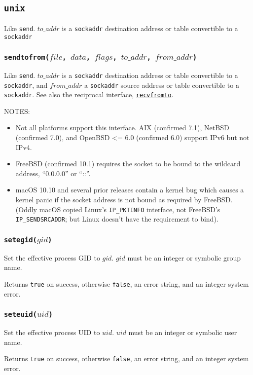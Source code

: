 \documentclass[11pt, oneside]{memoir}
\newcommand*{\true}[0]{\texttt{true}\xspace}
\newcommand*{\false}[0]{\texttt{false}\xspace}
\newcommand*{\syscall}[1]{\texttt{#1}\xspace}
\newcommand*{\fn}[1]{\texttt{#1}\xspace}
\newcommand*{\sockaddr}[0]{\texttt{sockaddr}\xspace}
\newcommand*{\seefn}[1]{\hyperref[#1]{\fn{#1}}\xspace}
\newcounter{toccols}
\newenvironment{Module}[1]{
	\subsection{\texttt{#1}}
	\addtocontents{toc}{
		\protect\begin{multicols}{\value{toccols}}
	}
}{
	\addtocontents{toc}{\protect\end{multicols}}
}
\begin{document}
\begin{Module}{unix}
Like \syscall{send}. $to\_addr$ is a \sockaddr destination address or table convertible to a \sockaddr

\subsubsection[\fn{sendtofrom}]{\fn{sendtofrom($file$, $data$, $flags$, $to\_addr$, $from\_addr$)}}

\label{sendtofrom}

Like \syscall{send}. $to\_addr$ is a \sockaddr destination address or table convertible to a \sockaddr, and $from\_addr$ a \sockaddr source address or table convertible to a \sockaddr. See also the reciprocal interface, \seefn{recvfromto}.

NOTES:
\begin{itemize}
\item Not all platforms support this interface. AIX (confirmed 7.1), NetBSD (confirmed 7.0), and OpenBSD <= 6.0 (confirmed 6.0) support IPv6 but not IPv4.
\item FreeBSD (confirmed 10.1) requires the socket to be bound to the wildcard address, ``0.0.0.0'' or ``::''.
\item macOS 10.10 and several prior releases contain a kernel bug which causes a kernel panic if the socket address is not bound as required by FreeBSD. (Oddly macOS copied Linux's \texttt{IP\_PKTINFO} interface, not FreeBSD's \texttt{IP\_SENDSRCADDR}; but Linux doesn't have the requirement to bind).
\end{itemize}

\subsubsection[\fn{setegid}]{\fn{setegid($gid$)}}

Set the effective process GID to $gid$. $gid$ must be an integer or symbolic group name.

Returns \true on success, otherwise \false, an error string, and an integer system error.

\subsubsection[\fn{seteuid}]{\fn{seteuid($uid$)}}

Set the effective process UID to $uid$. $uid$ must be an integer or symbolic user name.

Returns \true on success, otherwise \false, an error string, and an integer system error.


\end{Module}
\end{document}
